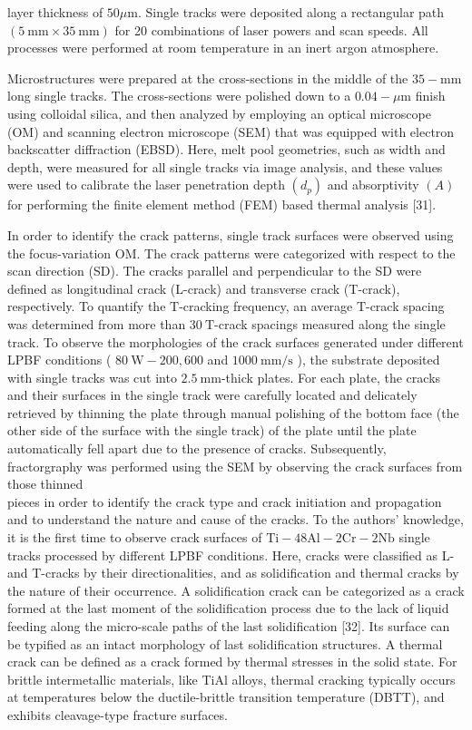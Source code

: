 \documentclass[10pt]{article}
\begin{document}
layer thickness of $50 \mu \mathrm{m}$. Single tracks were deposited along a rectangular path $(5 \mathrm{~mm} \times 35 \mathrm{~mm})$ for 20 combinations of laser powers and scan speeds. All processes were performed at room temperature in an inert argon atmosphere.

Microstructures were prepared at the cross-sections in the middle of the $35-\mathrm{mm}$ long single tracks. The cross-sections were polished down to a $0.04-\mu \mathrm{m}$ finish using colloidal silica, and then analyzed by employing an optical microscope (OM) and scanning electron microscope (SEM) that was equipped with electron backscatter diffraction (EBSD). Here, melt pool geometries, such as width and depth, were measured for all single tracks via image analysis, and these values were used to calibrate the laser penetration depth $\left(d_{p}\right)$ and absorptivity $(A)$ for performing the finite element method (FEM) based thermal analysis [31].

In order to identify the crack patterns, single track surfaces were observed using the focus-variation $\mathrm{OM}$. The crack patterns were categorized with respect to the scan direction (SD). The cracks parallel and perpendicular to the SD were defined as longitudinal crack (L-crack) and transverse crack (T-crack), respectively. To quantify the $\mathrm{T}$-cracking frequency, an average $\mathrm{T}$-crack spacing was determined from more than $30 \mathrm{~T}$-crack spacings measured along the single track. To observe the morphologies of the crack surfaces generated under different LPBF conditions ( $80 \mathrm{~W}-200,600$ and $1000 \mathrm{~mm} / \mathrm{s}$ ), the substrate deposited with single tracks was cut into $2.5 \mathrm{~mm}$-thick plates. For each plate, the cracks and their surfaces in the single track were carefully located and delicately retrieved by thinning the plate through manual polishing of the bottom face (the other side of the surface with the single track) of the plate until the plate automatically fell apart due to the presence of cracks. Subsequently, fractorgraphy was performed using the SEM by observing the crack surfaces from those thinned\\
pieces in order to identify the crack type and crack initiation and propagation and to understand the nature and cause of the cracks. To the authors' knowledge, it is the first time to observe crack surfaces of $\mathrm{Ti}-48 \mathrm{Al}-2 \mathrm{Cr}-2 \mathrm{Nb}$ single tracks processed by different LPBF conditions. Here, cracks were classified as L- and T-cracks by their directionalities, and as solidification and thermal cracks by the nature of their occurrence. A solidification crack can be categorized as a crack formed at the last moment of the solidification process due to the lack of liquid feeding along the micro-scale paths of the last solidification [32]. Its surface can be typified as an intact morphology of last solidification structures. A thermal crack can be defined as a crack formed by thermal stresses in the solid state. For brittle intermetallic materials, like TiAl alloys, thermal cracking typically occurs at temperatures below the ductile-brittle transition temperature (DBTT), and exhibits cleavage-type fracture surfaces.
\end{document}
